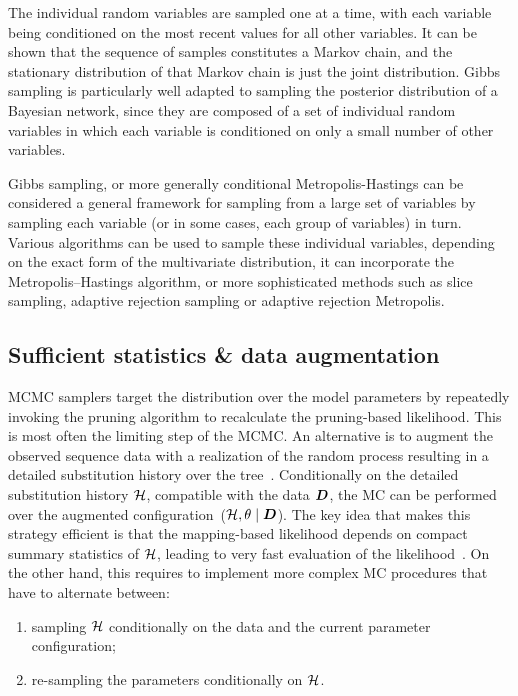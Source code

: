 The individual random variables are sampled one at a time, with each variable being conditioned on the most recent values for all other variables.
It can be shown that the sequence of samples constitutes a Markov chain, and the stationary distribution of that Markov chain is just the joint distribution.
Gibbs sampling is particularly well adapted to sampling the posterior distribution of a Bayesian network, since they are composed of a set of individual random variables in which each variable is conditioned on only a small number of other variables.

Gibbs sampling, or more generally conditional Metropolis-Hastings can be considered a general framework for sampling from a large set of variables by sampling each variable (or in some cases, each group of variables) in turn.
Various algorithms can be used to sample these individual variables, depending on the exact form of the multivariate distribution, it can incorporate the Metropolis–Hastings algorithm, or more sophisticated methods such as slice sampling, adaptive rejection sampling or adaptive rejection Metropolis.

\subsection{Sufficient statistics \& data augmentation}
\label{subsec:suffstats-data-augmentation}

MCMC samplers target the distribution over the model parameters by repeatedly invoking the pruning algorithm to recalculate the pruning-based likelihood.
This is most often the limiting step of the \acrshort{MCMC}.
An alternative is to augment the observed sequence data with a realization of the random process resulting in a detailed substitution history over the tree~\citep{Nielsen2002,Rodrigue2008}.
Conditionally on the detailed substitution history $\mathcal{H}$, compatible with the data $\bm{D}$, the \acrshort{MC} can be performed over the augmented configuration~($\mathcal{H}, \theta \mid \bm{D}$).
The key idea that makes this strategy efficient is that the mapping-based likelihood depends on compact summary statistics of $\mathcal{H}$, leading to very fast evaluation of the likelihood~\citep{Lartillot2006,DeKoning2010,Romiguier2012,Irvahn2014,Davydov2016,Gueguen2018}.
On the other hand, this requires to implement more complex \acrshort{MC} procedures that have to alternate between:
\begin{enumerate}
    \item sampling $\mathcal{H}$ conditionally on the data and the current parameter configuration;
    \item re-sampling the parameters conditionally on $\mathcal{H}$.
\end{enumerate}

